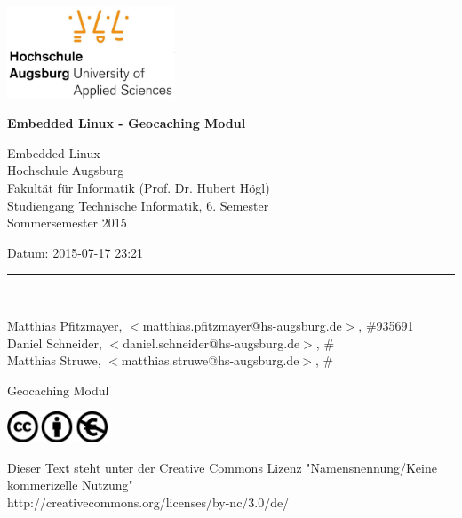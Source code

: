 




















\ \ 
\hfill
\begin{minipage}[t]{5cm}
\includegraphics[width=5cm]{img/hsa-logo.jpg}
\end{minipage}

\vskip 10mm

{\parindent=0pt

\thispagestyle{empty}


{\Large\bf Embedded Linux - Geocaching Modul
}

\vskip 5mm

Embedded Linux \\
Hochschule Augsburg \\
Fakultät für Informatik (Prof. Dr. Hubert Högl) \\
Studiengang Technische Informatik, 6. Semester \\

Sommersemester 2015
 

Datum: 2015-07-17 23:21 \\

\medskip

\rule{10cm}{4pt}\\

\medskip

Matthias Pfitzmayer, $<$matthias.pfitzmayer@hs-augsburg.de$>$, \#935691 \\
Daniel Schneider, $<$daniel.schneider@hs-augsburg.de$>$, \# \\
Matthias Struwe, $<$matthias.struwe@hs-augsburg.de$>$, \# \\


\vskip 2cm

\begin{center}
{\LARGE\bf

Geocaching Modul

}
\end{center}

\vfill

\begin{minipage}[t]{3cm}
\includegraphics[width=3cm]{img/cc-logo.jpg}
\end{minipage}

{\small
Dieser Text steht unter der Creative Commons Lizenz "Namensnennung/Keine kommerizelle Nutzung"\\
http://creativecommons.org/licenses/by-nc/3.0/de/
}

} %


\newpage
